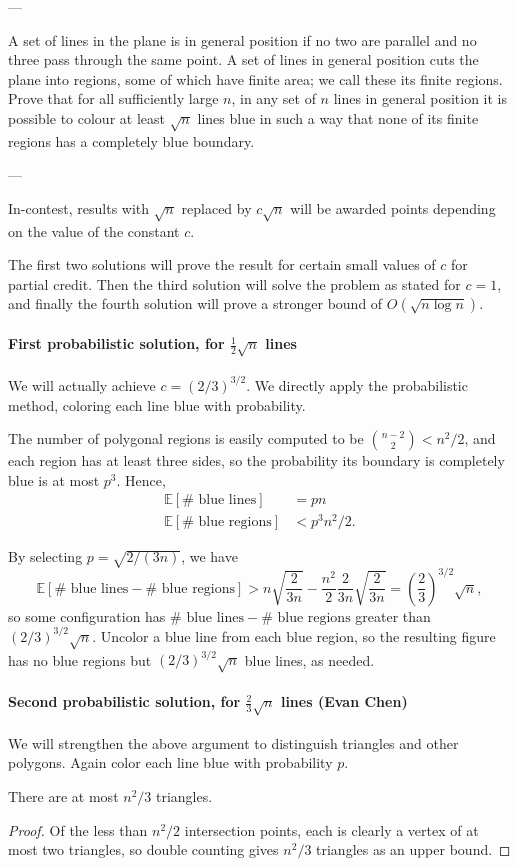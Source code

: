 
---

A set of lines in the plane is in general position if no two are parallel and no three pass through the same point. A set of lines in general position cuts the plane into regions, some of which have finite area; we call these its finite regions. Prove that for all sufficiently large $n$, in any set of $n$ lines in general position it is possible to colour at least $\sqrt n$ lines blue in such a way that none of its finite regions has a completely blue boundary.

---

In-contest, results with $\sqrt n$ replaced by $c\sqrt n$ will be awarded points depending on the value of the constant $c$.

The first two solutions will prove the result for certain small values of $c$ for partial credit. Then the third solution will solve the problem as stated for $c=1$, and finally the fourth solution will prove a stronger bound of $O(\sqrt{n\log n})$.

\paragraph{First probabilistic solution, for $\frac12\sqrt n$ lines} We will actually achieve $c=(2/3)^{3/2}$. We directly apply the probabilistic method, coloring each line blue with probability.

The number of polygonal regions is easily computed to be $\binom{n-2}2<n^2/2$, and each region has at least three sides, so the probability its boundary is completely blue is at most $p^3$. Hence,
\begin{align*}
    \mathbb E[\#\text{ blue lines}]&=pn\\
    \mathbb E[\#\text{ blue regions}]&<p^3n^2/2.
\end{align*}

By selecting $p=\sqrt{2/(3n)}$, we have
\[
    \mathbb E[\#\text{ blue lines}-\#\text{ blue regions}]>n\sqrt{\frac2{3n}}-\frac{n^2}2\frac2{3n}\sqrt{\frac2{3n}}=\left(\frac23\right)^{3/2}\sqrt n,
\]
so some configuration has $\#\text{ blue lines}-\#\text{ blue regions}$ greater than $(2/3)^{3/2}\sqrt n$. Uncolor a blue line from each blue region, so the resulting figure has no blue regions but $(2/3)^{3/2}\sqrt n$ blue lines, as needed.

\paragraph{Second probabilistic solution, for $\frac23\sqrt n$ lines (Evan Chen)} We will strengthen the above argument to distinguish triangles and other polygons. Again color each line blue with probability $p$.
\begin{claim*}
    There are at most $n^2/3$ triangles.
\end{claim*}
\begin{proof}
    Of the less than $n^2/2$ intersection points, each is clearly a vertex of at most two triangles, so double counting gives $n^2/3$ triangles as an upper bound.
\end{proof}

